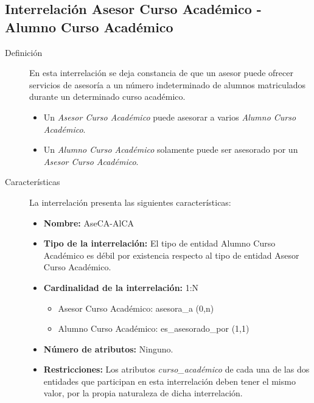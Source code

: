 \subsection{Interrelación Asesor Curso Académico - Alumno Curso Académico}

   \begin{description}
      \item[Definición] En esta interrelación se deja constancia de que un
      asesor puede ofrecer servicios de asesoría a un número indeterminado de
      alumnos matriculados durante un determinado curso académico.

      \begin{itemize}
       \item Un \textit{Asesor Curso Académico} puede asesorar a varios
             \textit{Alumno Curso Académico}.
       \item Un \textit{Alumno Curso Académico} solamente puede ser asesorado
             por un \textit{Asesor Curso Académico}.
      \end{itemize}

      \item[Características] La interrelación presenta las siguientes
                             características:

         \begin{itemize}
            \item \textbf{Nombre:} AseCA-AlCA
            \item \textbf{Tipo de la interrelación:} El tipo de entidad
                  Alumno Curso Académico es débil por existencia respecto al
                  tipo de entidad Asesor Curso Académico.
            \item \textbf{Cardinalidad de la interrelación:} 1:N
                  \begin{itemize}
                     \item Asesor Curso Académico: asesora\_a (0,n)
                     \item Alumno Curso Académico: es\_asesorado\_por (1,1)
                  \end{itemize}
            \item \textbf{Número de atributos:} Ninguno.
            \item \textbf{Restricciones:} Los atributos
                   \textit{curso\_académico} de cada una de las dos entidades
                   que participan en esta interrelación deben tener el mismo
                   valor, por la propia naturaleza de dicha interrelación.
         \end{itemize}


\end{description}

